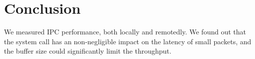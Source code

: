 \section{Conclusion}

We measured IPC performance, both locally and remotedly. We found out that the system call has an non-negligible impact on the latency of small packets, and the buffer size could significantly limit the throughput.